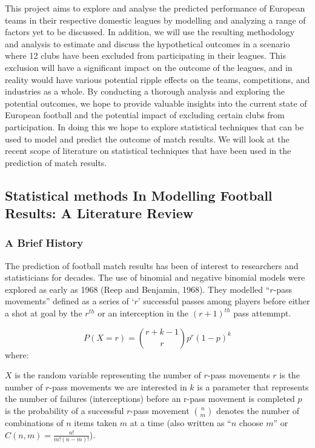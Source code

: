 \documentclass[
]{article}
\begin{document}
This project aims to explore and analyse the predicted performance of
European teams in their respective domestic leagues by modelling and
analyzing a range of factors yet to be discussed. In addition, we will
use the resulting methodology and analysis to estimate and discuss the
hypothetical outcomes in a scenario where 12 clubs have been excluded
from participating in their leagues. This exclusion will have a
significant impact on the outcome of the leagues, and in reality would
have various potential ripple effects on the teams, competitions, and
industries as a whole. By conducting a thorough analysis and exploring
the potential outcomes, we hope to provide valuable insights into the
current state of European football and the potential impact of excluding
certain clubs from participation. In doing this we hope to explore
statistical techniques that can be used to model and predict the outcome
of match results. We will look at the recent scope of literature on
statistical techniques that have been used in the prediction of match
results.

\hypertarget{statistical-methods-in-modelling-football-results-a-literature-review}{%
\subsection{Statistical methods In Modelling Football Results: A
Literature
Review}\label{statistical-methods-in-modelling-football-results-a-literature-review}}

\hypertarget{a-brief-history}{%
\subsubsection{A Brief History}\label{a-brief-history}}

The prediction of football match results has been of interest to
researchers and statisticians for decades. The use of binomial and
negative binomial models were explored as early as 1968 (Reep and
Benjamin, 1968). They modelled ``\(r\)-pass movements'' defined as a
series of `\(r\)' successful passes among players before either a shot
at goal by the \(r^{th}\) or an interception in the \((r+1)^{th}\) pass
attemmpt.

\[P(X = r) = \binom{r + k - 1}{r} p^r (1-p)^k\] where:

\(X\) is the random variable representing the number of \(r\)-pass
movements \(r\) is the number of \(r\)-pass movements we are interested
in \(k\) is a parameter that represents the number of failures
(interceptions) before an r-pass movement is completed \(p\) is the
probability of a successful \(r\)-pass movement \(\binom{n}{m}\) denotes
the number of combinations of \(n\) items taken \(m\) at a time (also
written as ``\(n\) choose \(m\)'' or \(C(n, m) = \frac{n!}{m!(n-m)!}\)).
\end{document}
